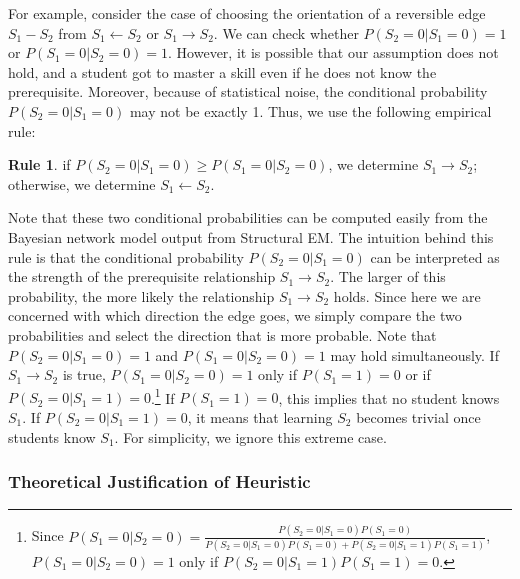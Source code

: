 \documentclass{edm_template}
\begin{document}
For example, consider the case of choosing the orientation of a reversible edge $S_1 - S_2$ from $S_1 \leftarrow S_2$ or  $S_1 \rightarrow S_2$.
We can check whether $P(S_2=0|S_1=0)=1$ or $P(S_1=0|S_2=0)=1$.
However, it is possible that our assumption does not hold, and a student got to master a skill even if he does not know the prerequisite. 
Moreover, because of statistical noise,  the conditional probability $P(S_2=0|S_1=0)$ may not  be exactly 1.
Thus, we use the following empirical rule: 

\textbf{Rule 1}. if $P(S_2=0|S_1=0)\ge P(S_1=0|S_2=0)$, we determine $S_1\rightarrow S_2$; otherwise, we determine $S_1\leftarrow S_2$.

Note that these two conditional probabilities can be computed easily from the Bayesian network model output from Structural EM. 
The intuition behind this rule is that the conditional probability $P(S_2=0|S_1=0)$ can be interpreted as the strength of the prerequisite relationship $S_1\rightarrow S_2$.
The larger of this probability, the more likely the relationship $S_1\rightarrow S_2$ holds.
Since here we are concerned with which direction the edge goes, we simply compare the two probabilities and select the direction that is more probable. 
Note  that $P(S_2=0|S_1=0)=1$ and $P(S_1=0|S_2=0)=1$ may hold simultaneously. 
If $S_1\rightarrow S_2$ is true, $P(S_1=0|S_2=0)=1$ only if $P(S_1=1)=0$ or if $P(S_2=0|S_1=1)=0$.\footnote{Since $P(S_1=0|S_2=0)=\frac{P(S_2=0|S_1=0)P(S_1=0)}{P(S_2=0|S_1=0)P(S_1=0)+P(S_2=0|S_1=1)P(S_1=1)}$, $P(S_1=0|S_2=0)=1$ only if $P(S_2=0|S_1=1)P(S_1=1)=0$.} 
If $P(S_1=1)=0$, this implies that no student knows $S_1$. 
If $P(S_2=0|S_1=1)=0$, it means that learning $S_2$ becomes trivial once students know $S_1$. 
For simplicity, we ignore this extreme case.


\subsubsection{Theoretical Justification of Heuristic}
\label{sec:theory}
\end{document}

